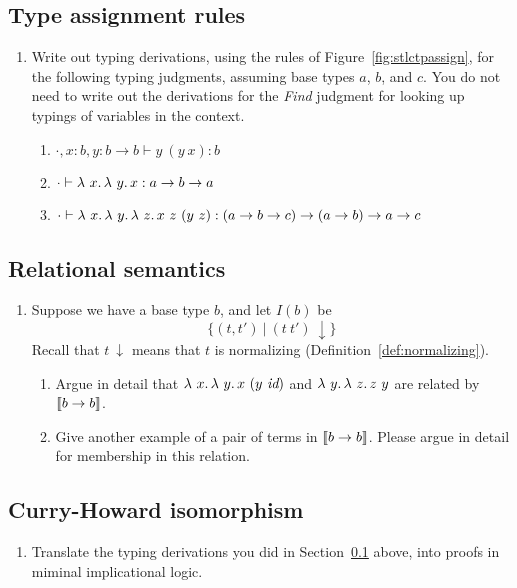 \subsection{Type assignment rules}
\label{sec:stlcextp}

\begin{enumerate}

\item Write out typing derivations, using the rules of Figure~\ref{fig:stlctpassign}, for
  the following typing judgments, assuming base types $a$, $b$, and $c$.  You do not need
  to write out the derivations for the \textit{Find} judgment for looking up typings of variables in the
  context.
  \begin{enumerate}
  \item $\cdot, x:b, y : b\to b \vdash y\ (y\ x) : b$
  \item $\cdot \vdash \lambda\ x.\, \lambda\ y.\, x : a \to b \to a$
  \item $\cdot \vdash \lambda\ x.\, \lambda\ y.\, \lambda\ z.\, x\ z\ (y\ z) : (a \to b \to c) \to (a \to b) \to a \to c$
  \end{enumerate}
\end{enumerate}  

\subsection{Relational semantics}

\begin{enumerate}
\item Suppose we have a base type $b$, and let $I(b)$ be
  \[
  \{ (t,t')\ |\ (t\ t')\ \downarrow \}
  \]
  \noindent Recall that $t\ \downarrow$ means that $t$ is normalizing (Definition~\ref{def:normalizing}).

  \begin{enumerate}
  \item Argue in detail that $\lambda\ x.\, \lambda\ y.\, x\ (y\ \textit{id})$ and $\lambda\ y.\, \lambda\ z.\, z\ y$
    are related by $\llbracket b \to b \rrbracket$.

  \item Give another example of a pair of terms in $\llbracket b \to b \rrbracket$.  Please argue in detail for membership in this relation.
  \end{enumerate}
\end{enumerate}

\subsection{Curry-Howard isomorphism}

\begin{enumerate}
\item Translate the typing derivations you did in Section~\ref{sec:stlcextp} above, into proofs in miminal implicational logic.
  \end{enumerate}
